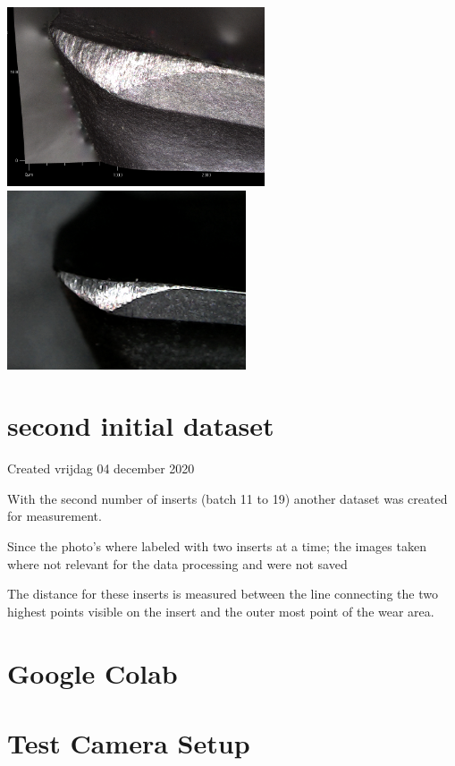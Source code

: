 \includegraphics[height=2.083333in, keepaspectratio=true]{./fig/Vision/Dataset/handmade_datasets/Second_handmade_dataset/t50b-img.PNG}\includegraphics[height=2.083333in, keepaspectratio=true]{./fig/Vision/Dataset/handmade_datasets/Second_handmade_dataset/b_005_p_010_s.jpg}


		\section{second initial dataset}

Created vrijdag 04 december 2020



With the second number of inserts (batch 11 to 19) another dataset was created for measurement.

Since the photo's where labeled with two inserts at a time; the images taken where not relevant for the data processing and were not saved



The distance for these inserts is measured between the line connecting the two highest points visible on the insert and the outer most point of the wear area.

\section{Google Colab}
\section{Test Camera Setup}

